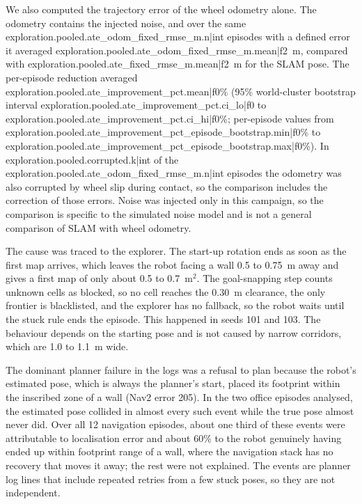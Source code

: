 
We also computed the trajectory error of the wheel odometry alone. The odometry contains the injected noise, and over the same {{exploration.pooled.ate_odom_fixed_rmse_m.n|int}} episodes with a defined error it averaged {{exploration.pooled.ate_odom_fixed_rmse_m.mean|f2}}~m, compared with {{exploration.pooled.ate_fixed_rmse_m.mean|f2}}~m for the SLAM pose. The per-episode reduction averaged {{exploration.pooled.ate_improvement_pct.mean|f0}}\% (95\% world-cluster bootstrap interval {{exploration.pooled.ate_improvement_pct.ci_lo|f0}} to {{exploration.pooled.ate_improvement_pct.ci_hi|f0}}\%; per-episode values from {{exploration.pooled.ate_improvement_pct_episode_bootstrap.min|f0}}\% to {{exploration.pooled.ate_improvement_pct_episode_bootstrap.max|f0}}\%). In {{exploration.pooled.corrupted.k|int}} of the {{exploration.pooled.ate_odom_fixed_rmse_m.n|int}} episodes the odometry was also corrupted by wheel slip during contact, so the comparison includes the correction of those errors. Noise was injected only in this campaign, so the comparison is specific to the simulated noise model and is not a general comparison of SLAM with wheel odometry.

The cause was traced to the explorer. The start-up rotation ends as soon as the first map arrives, which leaves the robot facing a wall 0.5 to 0.75~m away and gives a first map of only about 0.5 to 0.7~m$^2$. The goal-snapping step counts unknown cells as blocked, so no cell reaches the 0.30~m clearance, the only frontier is blacklisted, and the explorer has no fallback, so the robot waits until the stuck rule ends the episode. This happened in seeds 101 and 103. The behaviour depends on the starting pose and is not caused by narrow corridors, which are 1.0 to 1.1~m wide.

The dominant planner failure in the logs was a refusal to plan because the robot's estimated pose, which is always the planner's start, placed its footprint within the inscribed zone of a wall (Nav2 error 205). In the two office episodes analysed, the estimated pose collided in almost every such event while the true pose almost never did. Over all 12 navigation episodes, about one third of these events were attributable to localisation error and about 60\% to the robot genuinely having ended up within footprint range of a wall, where the navigation stack has no recovery that moves it away; the rest were not explained. The events are planner log lines that include repeated retries from a few stuck poses, so they are not independent.

